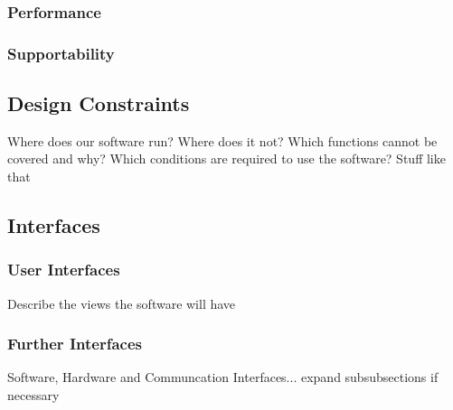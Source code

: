 \subsubsection{Performance}
\label{sec:domainBcc}
\subsubsection{Supportability}
\label{sec:domainBcd}

\subsection{Design Constraints}
\label{sec:domainBd}
Where does our software run? Where does it not? Which functions cannot be covered and why? Which conditions are required to use the software? Stuff like that

\subsection{Interfaces}
\label{sec:domainBe}
\subsubsection{User Interfaces}
\label{sec:domainBea}
Describe the views the software will have
\subsubsection{Further Interfaces}
\label{sec:domainBeb}
Software, Hardware and Communcation Interfaces... expand subsubsections if necessary
